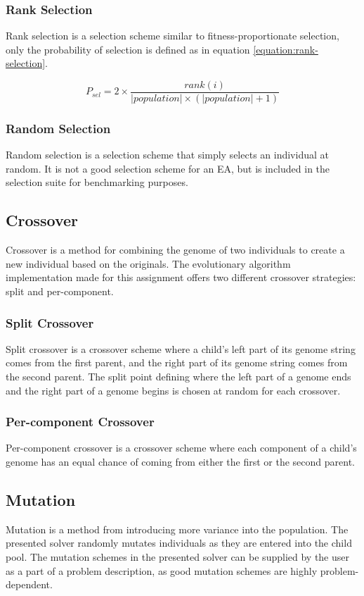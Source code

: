 \documentclass[twocolumn,oneside]{amsart}
\begin{document}
\subsubsection{Rank Selection}

Rank selection is a selection scheme similar to fitness-proportionate selection, only the probability of selection is defined as in equation \ref{equation:rank-selection}.

\begin{equation}\label{equation:rank-selection}
P_{sel} = 2 \times
\frac{rank(i)}
{| population | \times (| population | + 1)}
\end{equation}

\subsubsection{Random Selection}
Random selection is a selection scheme that simply selects an individual at random.
It is not a good selection scheme for an EA, but is included in the selection suite for benchmarking purposes.

\subsection{Crossover}
Crossover is a method for combining the genome of two individuals to create a new individual based on the originals.
The evolutionary algorithm implementation made for this assignment offers two different crossover strategies: split and per-component.

\subsubsection{Split Crossover}
Split crossover is a crossover scheme where a child's left part of its genome string comes from the first parent, and the right part of its genome string comes from the second parent.
The split point defining where the left part of a genome ends and the right part of a genome begins is chosen at random for each crossover.

\subsubsection{Per-component Crossover}
Per-component crossover is a crossover scheme where each component of a child's genome has an equal chance of coming from either the first or the second parent.


\subsection{Mutation}
Mutation is a method from introducing more variance into the population.
The presented solver randomly mutates individuals as they are entered into the child pool.
The mutation schemes in the presented solver can be supplied by the user as a part of a problem description, as good mutation schemes are highly problem-dependent.
\end{document}
